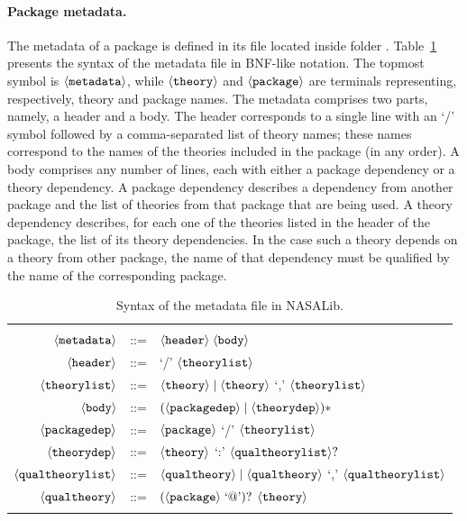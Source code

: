 \paragraph{Package metadata.} The metadata of a package is defined
in its  file located inside folder
. Table~\ref{tab.bnf} presents the syntax of the metadata
file in BNF-like notation. The topmost symbol is
$\langle{\texttt{metadata}}\rangle$, while $\langle{\texttt{theory}}\rangle$ and
$\langle{\texttt{package}}\rangle$ are terminals representing, respectively,
theory and package names. The metadata comprises two parts, namely, a
header and a body. The header corresponds to a single line with an `/'
symbol followed by a comma-separated list of theory names; these names
correspond to the names of the theories included in the package (in
any order). A body comprises any number of lines, each with either a
package dependency or a theory dependency. A package dependency
describes a dependency from another package and the list of theories
from that package that are being used. A theory dependency describes,
for each one of the theories listed in the header of the package, the
list of its theory dependencies. In the case such a theory depends on
a theory from other package, the name of that dependency must be
qualified by the name of the corresponding package.

\begin{table}
  \centering
  \begin{tabular}{r c p{8cm}}
    \hline \\
    $\langle{\texttt{metadata}}\rangle$ & ::= & $\langle{\texttt{header}}\rangle \; \langle{\texttt{body}}\rangle$ \\
    $\langle{\texttt{header}}\rangle$ & ::= & `/' $\langle{\texttt{theorylist}}\rangle$ \\
    $\langle{\texttt{theorylist}}\rangle$ & ::= & $\langle{\texttt{theory}}\rangle \mid \langle{\texttt{theory}}\rangle$ `,' $\langle{\texttt{theorylist}}\rangle$ \\
    $\langle{\texttt{body}}\rangle$ & ::= & $(\langle{\texttt{packagedep}}\rangle \mid \langle{\texttt{theorydep}}\rangle)*$ \\
    $\langle{\texttt{packagedep}}\rangle$ & ::= & $\langle{\texttt{package}}\rangle$ `/' $\langle{\texttt{theorylist}}\rangle$ \\
    $\langle{\texttt{theorydep}}\rangle$ & ::= & $\langle{\texttt{theory}}\rangle$ `:' $\langle{\texttt{qualtheorylist}}\rangle ?$ \\
    $\langle{\texttt{qualtheorylist}}\rangle$ & ::= & $\langle{\texttt{qualtheory}}\rangle \mid \langle{\texttt{qualtheory}}\rangle$ `,' $\langle{\texttt{qualtheorylist}}\rangle$ \\
    $\langle{\texttt{qualtheory}}\rangle$ & ::= & $(\langle{\texttt{package}}\rangle\; \text{`@'})?$ $\langle{\texttt{theory}}\rangle$ \\
    \\
    \hline
  \end{tabular}
  \caption{Syntax of the  metadata file in NASALib.}
  \label{tab.bnf}
\end{table}

